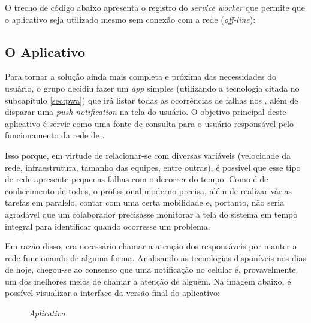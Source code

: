 O trecho de código abaixo apresenta o registro do \textit{service worker} que permite que o aplicativo seja utilizado mesmo sem conexão com a rede (\textit{off-line}):

\vspace*{1cm}
\begin{python}
    if ('serviceWorker' in navigator) {
        navigator.serviceWorker
            .register('service-worker.js')
            .then(reg => console.log("[ServiceWorker] Registered..."))
            [ . . .]
\end{python}
\vspace*{1cm}



\subsection{O Aplicativo}
\label{subsec:o_aplicativo}

Para tornar a solução ainda mais completa e próxima das necessidades do usuário, o grupo decidiu fazer um \textit{app} simples (utilizando a tecnologia citada no subcapítulo \ref{sec:pwa}) que irá listar todas as ocorrências de falhas nos \containers{}, além de disparar uma \textit{push notification} na tela do usuário. O objetivo principal deste aplicativo é servir como uma fonte de consulta para o usuário responsável pelo funcionamento da rede de \containers{}.

Isso porque, em virtude de relacionar-se com diversas variáveis (velocidade da rede, infraestrutura, tamanho das equipes, entre outras), é possível que esse tipo de rede apresente pequenas falhas com o decorrer do tempo. Como é de conhecimento de todos, o profissional moderno precisa, além de realizar várias tarefas em paralelo, contar com uma certa mobilidade e, portanto, não seria agradável que um colaborador precisasse monitorar a tela do sistema em tempo integral para identificar quando ocorresse um problema.

Em razão disso, era necessário chamar a atenção dos responsáveis por manter a rede funcionando de alguma forma. Analisando as tecnologias disponíveis nos dias de hoje, chegou-se ao consenso que uma notificação no celular é, provavelmente, um dos melhores meios de chamar a atenção de alguém. Na imagem abaixo, é possível visualizar a interface da versão final do aplicativo:

\begin{figure}[!htb]
    \centering
    \caption{\textit{Aplicativo}}
    \label{fig:aplicativo}
\end{figure}